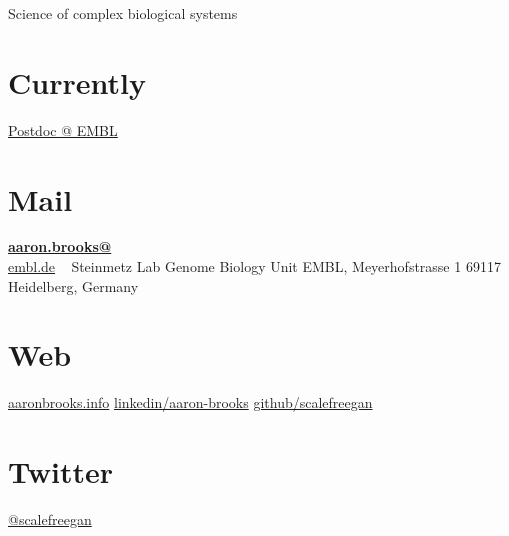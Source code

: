 \documentclass[]{friggeri-cv}
\begin{document}
      {Science of complex biological systems}
      

\begin{aside}
  \section{Currently}
    \href{http://www.embl.de/research/units/genome_biology/steinmetz/}{Postdoc @ EMBL}
    ~
  \section{Mail}
    \href{mailto:aaron.brooks@embl.de}{\textbf{aaron.brooks@}\\embl.de}
    ~
    Steinmetz Lab
    Genome Biology Unit
    EMBL, Meyerhofstrasse 1
    69117 Heidelberg, Germany
    ~
  \section{Web}
    \href{http://www.aaron-brooks.org}{aaronbrooks.info}
    \href{https://www.linkedin.com/pub/aaron-brooks/17/774/3b3}{linkedin/aaron-brooks}
    \href{https://github.com/scalefreegan}{github/scalefreegan}
   ~
  \section{Twitter}
    \href{https://twitter.com/scalefreegan}{@scalefreegan}
    ~
    ~
    ~
    ~
    ~
    ~
    ~
    ~
    ~
    ~
    ~
    ~
    ~
    ~
    ~
    ~
    ~
\end{aside}
\end{document}
